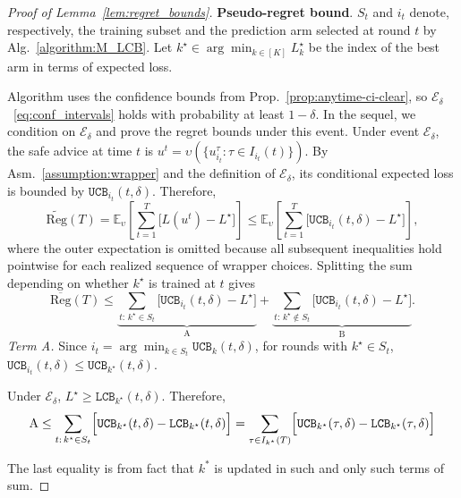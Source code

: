 \documentclass[a4paper,14pt]{extarticle}
\theoremstyle{plain}
\newcommand{\LCB}{\texttt{LCB}}
\newcommand{\UCB}{\texttt{UCB}}
\begin{document}
\begin{proof}[Proof of Lemma~\ref{lem:regret_bounds}]
\label{proof:regret_bound}
\textbf{Pseudo-regret bound}. $S_t$ and $i_t$ denote, respectively, the training subset and the prediction arm selected at round $t$ by Alg.~\ref{algorithm:M_LCB}.
Let $k^\star \in \arg\min_{k\in[K]} L_k^\star$ be the index of the best arm in terms of expected loss.

Algorithm uses the confidence bounds from Prop.~\ref{prop:anytime-ci-clear}, so $\mathcal{E}_\delta$ ~\eqref{eq:conf_intervals} holds with probability at least $1-\delta$. In the sequel, we condition on $\mathcal{E}_{\delta}$ and prove the regret bounds under this event. Under event $\mathcal{E}_\delta$, the safe advice at time $t$ is $u^t = \upsilon(\{u_{i_t}^\tau: \tau \in I_{i_t}(t)\})$. By Asm.~\ref{assumption:wrapper} and the definition of $\mathcal{E}_\delta$, its conditional expected loss is bounded by $\UCB_{i_t}(t,\delta)$. Therefore,
\begin{equation}\label{eq:best-reg-start}
\widetilde{\mathrm{Reg}}(T) = \mathbb E_{\upsilon}\left[\sum_{t=1}^{T}\bigl[L(u^t) - L^\star\bigr]\right]
\le \mathbb E_{\upsilon}\left[\sum_{t=1}^{T}\bigl[\UCB_{i_t}(t, \delta) - L^\star\bigr]\right],
\end{equation}
where the outer expectation is omitted because all subsequent inequalities hold pointwise for each realized sequence of wrapper choices. Splitting the sum depending on whether $k^\star$ is trained at $t$ gives
\begin{equation}
\overline{\mathrm{Reg}}(T)
\le \underbrace{\sum_{t:\,k^\star\in S_t} \bigl[\UCB_{i_t}(t, \delta) - L^\star\bigr]}_{\text{A}}
+
\underbrace{\sum_{t:\,k^\star\notin S_t}\bigl[\UCB_{i_t}(t, \delta) - L^\star\bigr]}_{\text{B}}.
\label{eq:best-A+B}
\end{equation}
\emph{Term A.}
Since $i_t=\arg\min_{k\in S_t}\UCB_k(t, \delta)$, for rounds with $k^\star\in S_t$, $\UCB_{i_t}(t, \delta) \le \UCB_{k^\star}(t, \delta).$

Under $\mathcal{E}_{\delta}$, $L^\star\ge \LCB_{k^\star}(t, \delta)$. Therefore,
\begin{equation}\label{eq:A-bound}
\text{A} \le \sum_{t:\,k^\star\in S_t} \Bigl[\UCB_{k^\star}(t, \delta)-\LCB_{k^\star}(t, \delta)\Bigr] =
\sum_{\tau \in I_{k^\star}(T)} \Bigl[\UCB_{k^\star}(\tau, \delta)-\LCB_{k^\star}(\tau, \delta)\Bigr]
\end{equation}

The last equality is from fact that $k^*$ is updated in such and only such terms of sum.


\end{proof}
\end{document}
